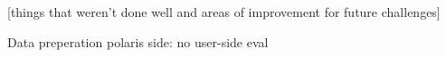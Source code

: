 \documentclass[journal=jcim,manuscript=article]{achemso}
\begin{document}
[things that weren’t done well and areas of improvement for future challenges]


Data preperation
polaris side:
no user-side eval



\end{document}
